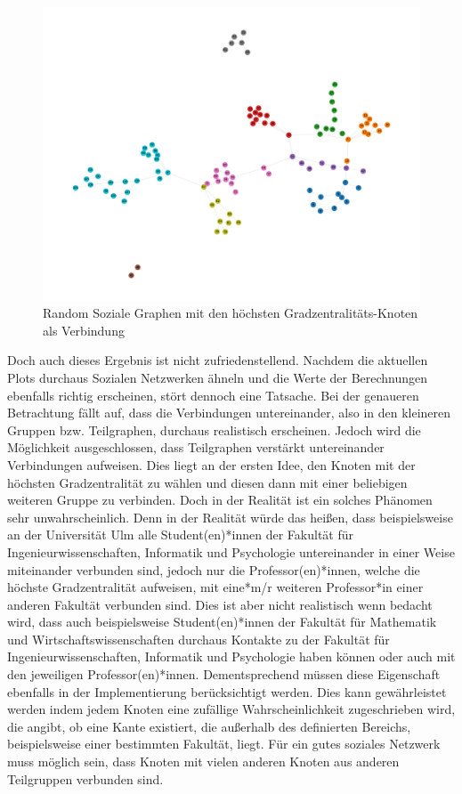\FloatBarrier
\begin{figure}[h!]
    \centering
    \hspace*{-1.5cm}
    \includegraphics[width=1.2\textwidth]{Graphics/NearSocialNetwork.png}
    \caption{Random Soziale Graphen mit den höchsten Gradzentralitäts-Knoten als Verbindung }
    \label{NearSozialerGraph}
\end{figure}

Doch auch dieses Ergebnis ist nicht zufriedenstellend.
Nachdem die aktuellen Plots durchaus Sozialen Netzwerken ähneln und die Werte der Berechnungen ebenfalls richtig erscheinen, stört dennoch eine Tatsache. Bei der genaueren Betrachtung fällt auf, dass die Verbindungen untereinander, also in den kleineren Gruppen bzw. Teilgraphen, durchaus realistisch erscheinen. Jedoch wird die Möglichkeit ausgeschlossen, dass Teilgraphen verstärkt untereinander Verbindungen aufweisen. Dies liegt an der ersten Idee, den Knoten mit der höchsten Gradzentralität zu wählen und diesen dann mit einer beliebigen weiteren Gruppe zu verbinden. Doch in der Realität ist ein solches Phänomen sehr unwahrscheinlich. Denn in der Realität würde das heißen, dass beispielsweise an der Universität Ulm alle Student(en)*innen der Fakultät für Ingenieurwissenschaften, Informatik und Psychologie untereinander in einer Weise miteinander verbunden sind, jedoch nur die Professor(en)*innen, welche die höchste Gradzentralität aufweisen, mit eine*m/r weiteren Professor*in einer anderen Fakultät verbunden sind. Dies ist aber nicht realistisch wenn bedacht wird, dass auch beispielsweise Student(en)*innen der Fakultät für Mathematik und Wirtschaftswissenschaften durchaus Kontakte zu der Fakultät für Ingenieurwissenschaften, Informatik und Psychologie haben können oder auch mit den jeweiligen Professor(en)*innen. Dementsprechend müssen diese Eigenschaft ebenfalls in der Implementierung berücksichtigt werden. Dies kann gewährleistet werden indem jedem Knoten eine zufällige Wahrscheinlichkeit zugeschrieben wird, die angibt, ob eine Kante existiert, die außerhalb des definierten Bereichs, beispielsweise einer bestimmten Fakultät, liegt. Für ein gutes soziales Netzwerk muss möglich sein, dass Knoten mit vielen anderen Knoten aus anderen Teilgruppen verbunden sind. 

